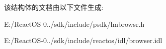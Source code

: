 该结构体的文档由以下文件生成\+:\begin{DoxyCompactItemize}
\item 
E\+:/\+React\+O\+S-\/0../sdk/include/psdk/lmbrowsr.\+h\item 
E\+:/\+React\+O\+S-\/0../sdk/include/reactos/idl/browser.\+idl\end{DoxyCompactItemize}
